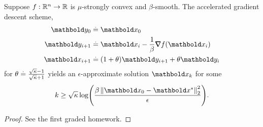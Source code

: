 \begin{thm} Suppose $f: \mathbb{R}^n \to \mathbb{R}$ is $\mu$-strongly convex and $\beta$-smooth. The accelerated gradient descent scheme, \begin{align}\begin{split}
    \vy_0 &\defeq \vx_0 \\
    \vy_{i+1} &\defeq \vx_i - \frac{1}{\beta} \grad f(\vx_i) \\
    \vx_{i+1} &\defeq (1+\theta)\vy_{i+1} + \theta\vy_i
\end{split}\end{align} for $\theta \overset{.}{=} \frac{\sqrt{\kappa} - 1}{\sqrt{\kappa} + 1}$ yields an $\epsilon$-approximate solution $\vx_k$ for some \begin{align*}
    k \geq \sqrt{\kappa}\log\parentheses*{\frac{\beta\norm{\vx_0 - \s{\vx}}_2^2}{\epsilon}}.
\end{align*}
\end{thm}
\begin{proof}
See the first graded homework.
\end{proof}

